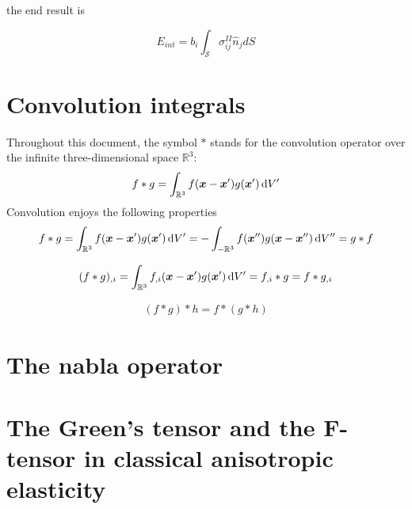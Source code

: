 the end result is

\begin{equation}
E_{int}=b_i\int_\mathcal{S} \sigma^{II}_{ij}\hat{n}_jdS
\end{equation}


%



%






\section{Convolution integrals}
Throughout this document, the symbol $*$ stands for the convolution operator over the infinite three-dimensional space $\mathbb{R}^3$:
\begin{align}
f*g=\int_{\mathbb{R}^3}f(\bm x-\bm x')g(\bm x')\, \text{d}V'
\end{align}
Convolution enjoys the following properties
\begin{align}
f*g=\int_{\mathbb{R}^3}f(\bm x-\bm x')g(\bm x')\, \text{d}V'=-\int_{-\mathbb{R}^3}f(\bm x'')g(\bm x-\bm x'')\, \text{d}V''=g*f
\end{align}

\begin{align}
(f*g)_{,i}=\int_{\mathbb{R}^3}f_{,i}(\bm x-\bm x')g(\bm x')\, \text{d}V'=f_{,i}*g=f*g_{,i}
\end{align}

\begin{align}
(f*g)*h=f*(g*h)
\end{align}

\section{The nabla operator}


\section{The Green's  tensor and the F-tensor in classical  anisotropic elasticity}

